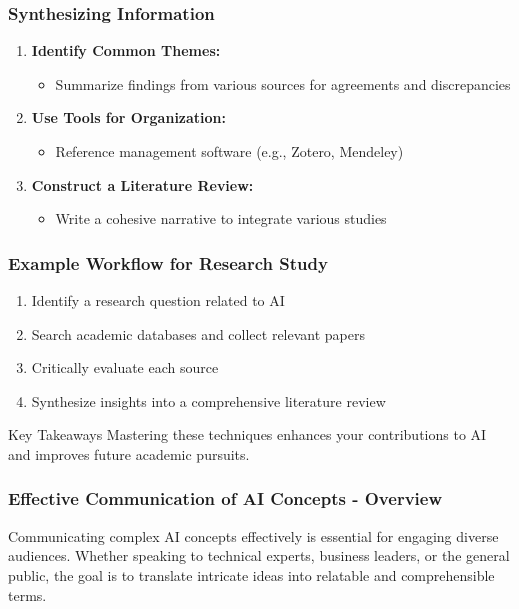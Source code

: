 \documentclass{beamer}
\begin{document}
\begin{frame}[fragile]
    \frametitle{Synthesizing Information}
    \begin{enumerate}
        \item \textbf{Identify Common Themes:}
            \begin{itemize}
                \item Summarize findings from various sources for agreements and discrepancies
            \end{itemize}

        \item \textbf{Use Tools for Organization:}
            \begin{itemize}
                \item Reference management software (e.g., Zotero, Mendeley)
            \end{itemize}

        \item \textbf{Construct a Literature Review:}
            \begin{itemize}
                \item Write a cohesive narrative to integrate various studies
            \end{itemize}
    \end{enumerate}
\end{frame}

\begin{frame}[fragile]
    \frametitle{Example Workflow for Research Study}
    \begin{enumerate}
        \item Identify a research question related to AI
        \item Search academic databases and collect relevant papers
        \item Critically evaluate each source
        \item Synthesize insights into a comprehensive literature review
    \end{enumerate}
    
    \begin{block}{Key Takeaways}
        Mastering these techniques enhances your contributions to AI and improves future academic pursuits.
    \end{block}
\end{frame}

\begin{frame}[fragile]
    \frametitle{Effective Communication of AI Concepts - Overview}
    Communicating complex AI concepts effectively is essential for engaging diverse audiences. Whether speaking to technical experts, business leaders, or the general public, the goal is to translate intricate ideas into relatable and comprehensible terms.
\end{frame}
\end{document}
